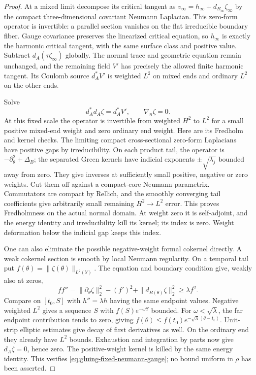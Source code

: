 \documentclass[11pt]{amsart}
\theoremstyle{definition}
\theoremstyle{remark}
\theoremstyle{plain}
\begin{document}
\begin{proof}
At a mixed limit decompose its critical tangent as
$v_\infty=h_\infty+d_{B_\infty}\zeta_\infty$ by the compact
three-dimensional covariant Neumann Laplacian. This zero-form
operator is invertible: a parallel section vanishes on the flat
irreducible boundary fiber. Gauge covariance preserves the linearized
critical equation, so $h_\infty$ is exactly the harmonic critical
tangent, with the same surface class and positive value. Subtract
$d_A(\tau\zeta_\infty)$ globally. The normal trace and geometric
equation remain unchanged, and the remaining field $V'$ has
precisely the allowed finite harmonic tangent. Its Coulomb source
$d_A^*V'$ is weighted $L^2$ on mixed ends and ordinary $L^2$
on the other ends.

Solve
\begin{equation}\label{eq:gluing-fixed-neumann-gauge}
                  d_A^*d_A\zeta=d_A^*V',\qquad \nabla_n\zeta=0.
\end{equation}
At this fixed scale the operator is invertible from weighted $H^2$
to $L^2$ for a small positive mixed-end weight and zero ordinary
end weight. Here are its Fredholm and kernel checks. The limiting
compact cross-sectional zero-form Laplacians have positive gaps by
irreducibility. On each product tail, the operator is
$-\partial_\theta^2+\Delta_B$; the separated Green kernels
have indicial exponents $\pm\sqrt{\lambda_j}$ bounded away
from zero. They give inverses at sufficiently small positive,
negative or zero weights. Cut them off against a compact-core
Neumann parametrix. Commutators are compact by Rellich, and the
smoothly converging tail coefficients give arbitrarily small remaining
$H^2\to L^2$ error. This proves Fredholmness on the actual
normal domain. At weight zero it is self-adjoint, and the energy
identity and irreducibility kill its kernel; its index is zero.
Weight deformation below the indicial gap keeps this index.

One can also eliminate the possible negative-weight formal cokernel
directly. A weak cokernel section is smooth by local Neumann regularity.
On a temporal tail put $f(\theta)=\|\zeta(\theta)\|_{L^2(Y)}$.
The equation and boundary condition give, weakly also at zeros,
\[
 f f''=\|\partial_\theta\zeta\|_2^2-(f')^2
                      +\|d_{B(\theta)}\zeta\|_2^2\geq\lambda f^2.
\]
Compare on $[t_0,S]$ with $h''=\lambda h$ having the same
endpoint values. Negative weighted $L^2$ gives a sequence $S$
with $f(S)e^{-\omega S}$ bounded. For $\omega<\sqrt\lambda$,
the far endpoint contribution tends to zero, giving
$f(\theta)\leq f(t_0)e^{-\sqrt\lambda(\theta-t_0)}$.
Unit-strip elliptic estimates give decay of first derivatives as well.
On the ordinary end they already have $L^2$ bounds. Exhaustion
and integration by parts now give $d_A\zeta=0$, hence zero.
The positive-weight kernel is killed by the same energy identity.
This verifies \eqref{eq:gluing-fixed-neumann-gauge}; no bound
uniform in $\rho$ has been asserted.


\end{proof}
\end{document}
